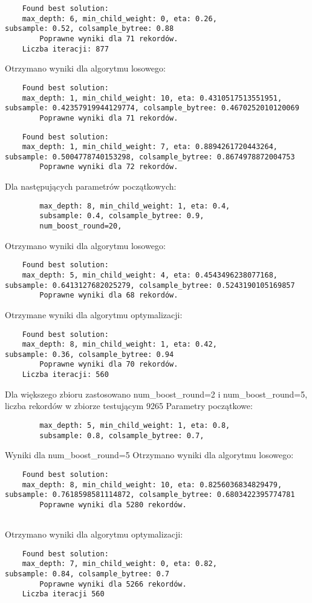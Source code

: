 \documentclass[a4paper,12p]{article}
\begin{document}
	\begin{verbatim}
	Found best solution:
	max_depth: 6, min_child_weight: 0, eta: 0.26,
subsample: 0.52, colsample_bytree: 0.88
        Poprawne wyniki dla 71 rekordów.
	Liczba iteracji: 877
	\end{verbatim}
	
	Otrzymano wyniki dla algorytmu losowego:
	\begin{verbatim}
	Found best solution:
	max_depth: 1, min_child_weight: 10, eta: 0.4310517513551951,
subsample: 0.42357919944129774, colsample_bytree: 0.4670252010120069
        Poprawne wyniki dla 71 rekordów.
	\end{verbatim}
	\begin{verbatim}
	Found best solution:
	max_depth: 1, min_child_weight: 7, eta: 0.8894261720443264,
subsample: 0.5004778740153298, colsample_bytree: 0.8674978872004753
        Poprawne wyniki dla 72 rekordów.
	\end{verbatim}
	
	Dla następujących parametrów początkowych:
	\begin{verbatim}
		max_depth: 8, min_child_weight: 1, eta: 0.4,
		subsample: 0.4, colsample_bytree: 0.9,	
		num_boost_round=20,
	\end{verbatim}
	
	Otrzymano wyniki dla algorytmu losowego:
	\begin{verbatim}
	Found best solution:
	max_depth: 5, min_child_weight: 4, eta: 0.4543496238077168,
subsample: 0.6413127682025279, colsample_bytree: 0.5243190105169857
        Poprawne wyniki dla 68 rekordów.
	\end{verbatim}
	
	Otrzymane wyniki dla algorytmu optymalizacji:
	\begin{verbatim}
	Found best solution:
	max_depth: 8, min_child_weight: 1, eta: 0.42,
subsample: 0.36, colsample_bytree: 0.94
        Poprawne wyniki dla 70 rekordów.
	Liczba iteracji: 560
	\end{verbatim}
	
	Dla większego zbioru zastosowano num_boost_round=2 i num_boost_round=5, liczba rekordów w zbiorze testującym 9265  
	Parametry początkowe:
	\begin{verbatim}
		max_depth: 5, min_child_weight: 1, eta: 0.8,
		subsample: 0.8, colsample_bytree: 0.7,	
	\end{verbatim}
	
	Wyniki dla num_boost_round=5
	Otrzymano wyniki dla algorytmu losowego:
	\begin{verbatim}
	Found best solution:
	max_depth: 8, min_child_weight: 10, eta: 0.8256036834829479,
subsample: 0.7618598581114872, colsample_bytree: 0.6803422395774781
        Poprawne wyniki dla 5280 rekordów.
	
	\end{verbatim}Otrzymano wyniki dla algorytmu optymalizacji:
	\begin{verbatim}
	Found best solution:
	max_depth: 7, min_child_weight: 0, eta: 0.82,
subsample: 0.84, colsample_bytree: 0.7
        Poprawne wyniki dla 5266 rekordów.
	Liczba iteracji 560
	\end{verbatim}
	
\end{document}
